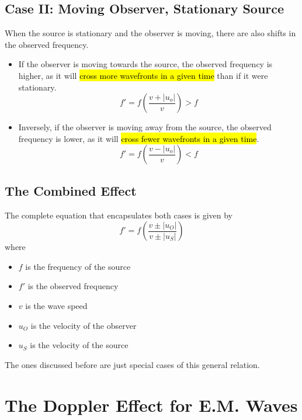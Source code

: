 \documentclass[a4paper,12pt]{article}
\let\oldsection\section
\renewcommand\section{\clearpage\oldsection}
\newcommand{\paren}[1]{\left(#1\right)}
\begin{document}
\pagebreak


\subsection{Case II: Moving Observer, Stationary Source}

When the source is stationary and the observer is moving, there are also shifts in the observed frequency.
\begin{itemize}
  \item If the observer is moving towards the source, the observed frequency is higher, as it will \hl{cross more wavefronts in a given time} than if it were stationary.
        \begin{equation}
          f' = f\paren{\frac{v + |u_o|}{v}} > f
        \end{equation}
  \item Inversely, if the observer is moving away from the source, the observed frequency is lower, as it will \hl{cross fewer wavefronts in a given time}.
        \begin{equation}
          f' = f\paren{\frac{v - |u_o|}{v}} < f
        \end{equation}
\end{itemize}

\subsection{The Combined Effect}

The complete equation that encapsulates both cases is given by
\begin{equation}
  f' = f\paren{\frac{v\pm |u_O|}{v\pm |u_S|}}
\end{equation}
where
\begin{itemize}
  \item $f$ is the frequency of the source
  \item $f'$ is the observed frequency
  \item $v$ is the wave speed
  \item $u_O$ is the velocity of the observer
  \item $u_S$ is the velocity of the source
\end{itemize}

The ones discussed before are just special cases of this general relation.

\section{The Doppler Effect for E.M. Waves}
\end{document}
